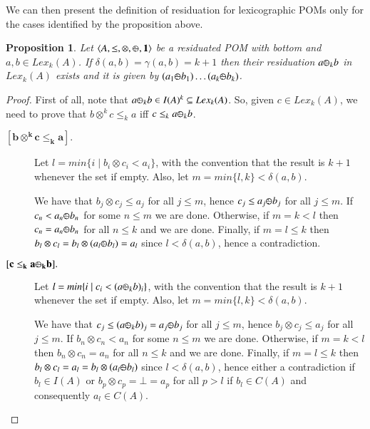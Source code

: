 \documentclass[a4paper]{elsarticle}
\newtheorem{proposition}{Proposition}
\newcommand{\monop}{\otimes}
\newcommand{\1}{\mathbf{1}}
\def\odiv{{ \ominus\hspace{-8pt}:}\;}
\begin{document}
We can then present the definition of residuation for lexicographic POMs only
for the cases identified by the proposition above.


\begin{proposition}
	\label{div0}
	Let $\langle A, \leq, \monop, \odiv, \1 \rangle$
	be a residuated POM with bottom and $a, b \in Lex_k(A)$.
	If $\delta(a,b) = \gamma(a,b) = k+1$
	then their residuation $a \odiv_k b$ 
	in $Lex_k(A)$ exists and it is given by 
	$(a_1 \odiv b_1) \ldots  (a_k \odiv b_k)$.
\end{proposition}

\begin{proof}
	First of all, note that 
	$a \odiv_k b \in I(A)^k \subseteq Lex_k(A)$.
	So, given $c \in Lex_k(A)$, we need to prove that
	$b\otimes^k c \leq_k a$ iff $c \leq_k a \odiv_k b$.
	
	\begin{description}
		\item[$\mathbf{[b\otimes^k c \leq_k a].}$]
		Let $l = min \{ i \mid b_i \otimes c_i < a_i\}$,
		with the convention that the result is $k+1$ whenever the set if empty.
		Also, let $m = min\{l, k\} < \delta(a,b)$.
		
		We have that $b_j \otimes c_j \leq a_j$ for all $j \leq m$, hence
		$c_j \leq a_j \odiv b_j $ for all $j \leq m$. 
		If $c_n < a_n \odiv b_n$ for some $n \leq m$
		we are done. 
		Otherwise, if $m = k < l$ then 
		$c_n = a_n \odiv b_n$ for all $n \leq k$ and we are done.
		Finally, if $m = l \leq k $ then 
		$b_l \otimes c_l = b_l  \otimes (a_l \odiv b_l) = a_l$
		since $l < \delta(a,b)$, hence a contradiction.
		
		\item[$\mathbf{[c \leq_k a \odiv_k b].}$]
		Let $l = min \{ i \mid c_i < (a \odiv_k b)_i\}$,
		with the convention that the result is $k+1$ whenever the set if empty.
		Also, let $m = min \{l, k\} < \delta(a,b)$.
		
		We have that $c_j \leq (a \odiv_k b)_j = a_j \odiv b_j$ for all $j \leq m$, hence
		$b_j \otimes c_j \leq a_j$ for all $j \leq m$.
		If $b_n \otimes c_n < a_n$ for some $n \leq m$
		we are done. 
		Otherwise, if $m = k < l$ then 
		$b_n \otimes c_n = a_n$ for all $n \leq k$	and we are done.
		Finally, if $m = l \leq k$ then 
		$b_l \otimes c_l = a_l = b_l \otimes (a_l \odiv b_l)$
		since $l < \delta(a,b)$, hence either a contradiction
		if $b_l \in I(A)$ or $b_p \otimes c_p = \bot = a_p$ for all $p > l$
		if $b_l \in C(A)$ and consequently $a_l \in C(A)$.
	\end{description}
\end{proof}
\end{document}
